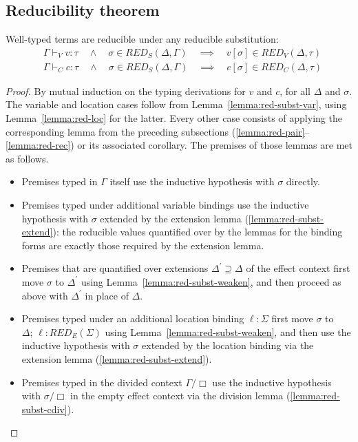 \documentclass[acmsmall, screen, review, anonymous]{acmart}
\theoremstyle{definition}
\newcommand{\loc}{\ell}
\newcommand{\types}{\mathrel{:}}
\newcommand{\ccons}[2]{#1;\,#2}
\newcommand{\lbind}[3]{\ccons{#1}{#2\types#3}}
\newcommand{\cdiv}[1]{#1/\Box}
\newcommand{\turnv}{\mathrel{\vdash_V}}
\newcommand{\turnc}{\mathrel{\vdash_C}}
\newcommand{\redname}{RED}
\newcommand{\redvname}{\redname_{V}}
\newcommand{\redv}[2]{\redvname{({#1},{#2})}}
\newcommand{\redcname}{\redname_{C}}
\newcommand{\redc}[2]{\redcname{({#1},{#2})}}
\newcommand{\redsname}{\redname_{S}}
\newcommand{\reds}[2]{\redsname{({#1},{#2})}}
\newcommand{\redsigname}{\redname_{E}}
\newcommand{\redsig}[1]{\redsigname{(#1)}}
\begin{document}
\subsection{Reducibility theorem}
Well-typed terms are reducible under any reducible substitution:
\begin{align*}
    &\Gamma \turnv v \types \tau
      \quad \wedge \quad \sigma \in \reds{\Delta}{\Gamma}
      \quad \implies \quad v[\sigma] \in \redv{\Delta}{\tau} \\
    &\Gamma \turnc c \types \tau
      \quad \wedge \quad \sigma \in \reds{\Delta}{\Gamma}
      \quad \implies \quad c[\sigma] \in \redc{\Delta}{\tau}
\end{align*}
\begin{proof}
  By mutual induction on the typing derivations for $v$ and $c$, for
  all $\Delta$ and $\sigma$. The variable and location cases follow
  from Lemma~\ref{lemma:red-subst-var}, using Lemma~\ref{lemma:red-loc}
  for the latter. Every other case consists of applying the
  corresponding lemma from the preceding subsections
  (\ref{lemma:red-pair}--\ref{lemma:red-rec}) or its associated
  corollary. The premises of those lemmas are met as follows.
  \begin{itemize}
  \item Premises typed in $\Gamma$ itself use the inductive hypothesis
    with $\sigma$ directly.
  \item Premises typed under additional variable bindings use the
    inductive hypothesis with $\sigma$ extended by the extension lemma
    (\ref{lemma:red-subst-extend}): the reducible values quantified over
    by the lemmas for the binding forms are exactly those required by
    the extension lemma.
  \item Premises that are quantified over extensions
    $\Delta^{\prime} \supseteq \Delta$ of the effect context first move
    $\sigma$ to $\Delta^{\prime}$ using
    Lemma~\ref{lemma:red-subst-weaken}, and then proceed as above with
    $\Delta^{\prime}$ in place of $\Delta$.
  \item Premises typed under an additional location binding
    $\loc \types \Sigma$ first move $\sigma$ to
    $\lbind{\Delta}{\loc}{\redsig{\Sigma}}$ using
    Lemma~\ref{lemma:red-subst-weaken}, and then use the inductive
    hypothesis with $\sigma$ extended by the location binding via the
    extension lemma (\ref{lemma:red-subst-extend}).
  \item Premises typed in the divided context $\cdiv{\Gamma}$ use the
    inductive hypothesis with $\cdiv{\sigma}$ in the empty effect
    context via the division lemma (\ref{lemma:red-subst-cdiv}).
  \end{itemize}
\end{proof}
\end{document}
